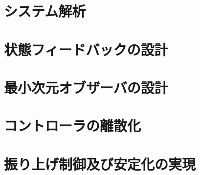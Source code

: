 \section{システム解析}
\section{状態フィードバックの設計}
\section{最小次元オブザーバの設計}
\section{コントローラの離散化}
\section{振り上げ制御及び安定化の実現}